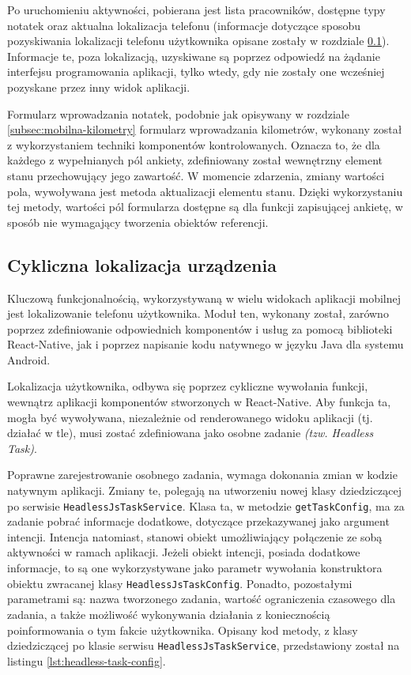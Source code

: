 Po uruchomieniu aktywności, pobierana jest lista pracowników, dostępne typy notatek oraz aktualna lokalizacja telefonu (informacje dotyczące sposobu pozyskiwania lokalizacji telefonu użytkownika opisane zostały w rozdziale \ref{sec:cykliczna-lokalizacja}). Informacje te, poza lokalizacją, uzyskiwane są poprzez odpowiedź na żądanie interfejsu programowania aplikacji, tylko wtedy, gdy nie zostały one wcześniej pozyskane przez inny widok aplikacji.

Formularz wprowadzania notatek, podobnie jak opisywany w rozdziale \ref{subsec:mobilna-kilometry} formularz wprowadzania kilometrów, wykonany został z wykorzystaniem techniki komponentów kontrolowanych. Oznacza to, że dla każdego z wypełnianych pól ankiety, zdefiniowany został wewnętrzny element stanu przechowujący jego zawartość. W momencie zdarzenia, zmiany wartości pola, wywoływana jest metoda aktualizacji elementu stanu. Dzięki wykorzystaniu tej metody, wartości pól formularza dostępne są dla funkcji zapisującej ankietę, w sposób nie wymagający tworzenia obiektów referencji.
\subsection{Cykliczna lokalizacja urządzenia}
\label{sec:cykliczna-lokalizacja}
Kluczową funkcjonalnością, wykorzystywaną w wielu widokach aplikacji mobilnej jest lokalizowanie telefonu użytkownika. Moduł ten, wykonany został, zarówno poprzez zdefiniowanie odpowiednich komponentów i usług za pomocą biblioteki React-Native, jak i poprzez napisanie kodu natywnego w języku Java dla systemu Android.

Lokalizacja użytkownika, odbywa się poprzez cykliczne wywołania funkcji, wewnątrz aplikacji komponentów stworzonych w React-Native. Aby funkcja ta, mogła być wywoływana, niezależnie od renderowanego widoku aplikacji (tj. działać w tle), musi zostać zdefiniowana jako osobne zadanie \textit{(tzw. Headless Task)}.

Poprawne zarejestrowanie osobnego zadania, wymaga dokonania zmian w kodzie natywnym aplikacji. Zmiany te, polegają na utworzeniu nowej klasy dziedziczącej po serwisie \texttt{HeadlessJsTaskService}. Klasa ta, w metodzie \texttt{getTaskConfig}, ma za zadanie pobrać informacje dodatkowe, dotyczące przekazywanej jako argument intencji. Intencja natomiast, stanowi obiekt umożliwiający połączenie ze sobą aktywności w ramach aplikacji. Jeżeli obiekt intencji, posiada dodatkowe informacje, to są one wykorzystywane jako parametr wywołania konstruktora obiektu zwracanej klasy \texttt{HeadlessJsTaskConfig}. Ponadto, pozostałymi parametrami są: nazwa tworzonego zadania, wartość ograniczenia czasowego dla zadania, a także możliwość wykonywania działania z koniecznością poinformowania o tym fakcie użytkownika. Opisany kod metody, z klasy dziedziczącej po klasie serwisu \texttt{HeadlessJsTaskService}, przedstawiony został na listingu \ref{lst:headless-task-config}.

